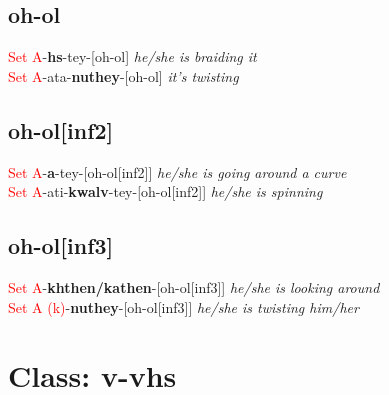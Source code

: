 \documentclass[oneside,openany]{book}%
\begin{document}
\subsection*{oh-ol}%
\textcolor{Red}{Set A}{-}\textbf{hs}{-}tey{-}[oh-ol] \textit{ he/she is braiding it} \\%
\textcolor{Red}{Set A}{-}ata{-}\textbf{nuthey}{-}[oh-ol] \textit{ it's twisting} \\%
\vspace{1em}%
\needspace{1in}%
\subsection*{oh-ol[inf2]}%
\textcolor{Red}{Set A}{-}\textbf{a}{-}tey{-}[oh-ol[inf2]] \textit{ he/she is going around a curve} \\%
\textcolor{Red}{Set A}{-}ati{-}\textbf{kwalv}{-}tey{-}[oh-ol[inf2]] \textit{ he/she is spinning} \\%
\vspace{1em}%
\needspace{1in}%
\subsection*{oh-ol[inf3]}%
\textcolor{Red}{Set A}{-}\textbf{khthen/kathen}{-}[oh-ol[inf3]] \textit{ he/she is looking around} \\%
\textcolor{Red}{Set A (k)}{-}\textbf{nuthey}{-}[oh-ol[inf3]] \textit{ he/she is twisting him/her} \\%
\vspace{1em}%
\needspace{3in}%
\section*{Class: v-vhs}%
%
\needspace{1in}%
\end{document}

